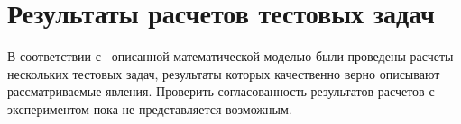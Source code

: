 %
\section{Результаты расчетов тестовых задач}
%
В соответствии с~ описанной математической моделью были проведены расчеты
нескольких тестовых задач, результаты которых качественно верно описывают
рассматриваемые явления. Проверить согласованность результатов расчетов с~
экспериментом пока не представляется возможным.






